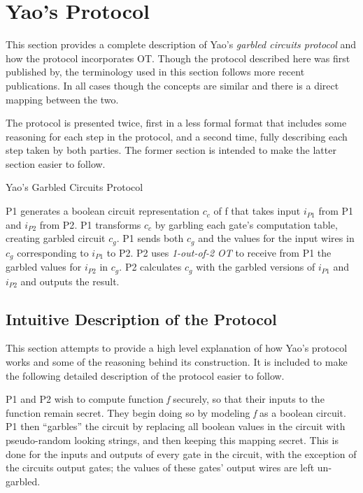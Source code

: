 \section{Yao's Protocol}
\label{sec:protocol}

This section provides a complete description of Yao's \emph{garbled circuits protocol} and how the protocol incorporates \ac{OT}.  Though the protocol described here was first published by\cite{goldreich1987play}, the terminology used in this section follows more recent publications\cite{hazay2010efficient}. In all cases though the concepts are similar and there is a direct mapping between the two.

The protocol is presented twice, first in a less formal format that includes some reasoning for each step in the protocol, and a second time, fully describing each step taken by both parties. The former section is intended to make the latter section easier to follow.

\begin{algorithm}[H]
    \caption{Yao's Garbled Circuits Protocol}
    \label{alg:yao}
    \begin{algorithmic}[1]
        \STATE \ac{P1} generates a boolean circuit representation $c_c$ of \ac{f} that takes input $i_{P1}$ from \ac{P1} and $i_{P2}$ from \ac{P2}.
        \STATE \ac{P1} transforms $c_c$ by garbling each gate's computation table, creating garbled circuit $c_g$.
        \STATE \ac{P1} sends both $c_g$ and the values for the input wires in $c_g$ corresponding to $i_{P1}$ to \ac{P2}.
        \STATE \ac{P2} uses \emph{1-out-of-2 \ac{OT}} to receive from \ac{P1} the garbled values for $i_{P2}$ in $c_g$.
        \STATE \ac{P2} calculates $c_g$ with the garbled versions of $i_{P1}$ and $i_{P2}$ and outputs the result.
    \end{algorithmic}
\end{algorithm}

\subsection{Intuitive Description of the Protocol}

This section attempts to provide a high level explanation of how Yao's protocol works and some of the reasoning behind its construction. It is included to make the following detailed description of the protocol easier to follow.

\ac{P1} and \ac{P2} wish to compute function \emph{f} securely, so that their inputs to the function remain secret. They begin doing so by modeling \emph{f} as a boolean circuit. \ac{P1} then ``garbles'' the circuit by replacing all boolean values in the circuit with pseudo-random looking strings, and then keeping this mapping secret.  This is done for the inputs and outputs of every gate in the circuit, with the exception of the circuits output gates; the values of these gates' output wires are left un-garbled.

